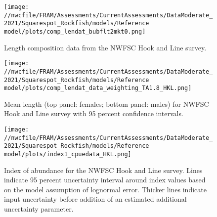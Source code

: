 \documentclass[11pt,
  english,
  a4paper,
]{article}
\begin{document}

\begin{figure}
\centering
\texttt{[image: //nwcfile/FRAM/Assessments/CurrentAssessments/DataModerate\_2021/Squarespot\_Rockfish/models/Reference model/plots/comp\_lendat\_bubflt2mkt0.png]}
\caption{Length composition data from the NWFSC Hook and Line survey.\label{fig:hkl-len-data}}
\end{figure}

\tagmcend\tagstructend


\begin{figure}
\centering
\texttt{[image: //nwcfile/FRAM/Assessments/CurrentAssessments/DataModerate\_2021/Squarespot\_Rockfish/models/Reference model/plots/comp\_lendat\_data\_weighting\_TA1.8\_HKL.png]}
\caption{Mean length (top panel: females; bottom panel: males) for NWFSC Hook and Line survey with 95 percent confidence intervals.\label{fig:mean-hkl-len-data}}
\end{figure}

\tagmcend\tagstructend


\begin{figure}
\centering
\texttt{[image: //nwcfile/FRAM/Assessments/CurrentAssessments/DataModerate\_2021/Squarespot\_Rockfish/models/Reference model/plots/index1\_cpuedata\_HKL.png]}
\caption{Index of abundance for the NWFSC Hook and Line survey. Lines indicate 95 percent uncertainty interval around index values based on the model assumption of lognormal error. Thicker lines indicate input uncertainty before addition of an estimated additional uncertainty parameter.\label{fig:hkl-index}}
\end{figure}

\tagmcend\tagstructend
\end{document}
